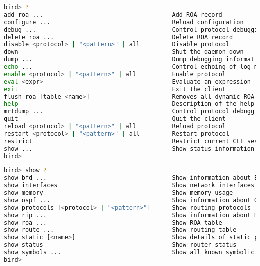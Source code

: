 \begin{lstlisting}[language=bash, caption={Help on Birdc Console mode.}]
bird> ?
add roa ...                                    Add ROA record
configure ...                                  Reload configuration
debug ...                                      Control protocol debugging via BIRD logs
delete roa ...                                 Delete ROA record
disable <protocol> | "<pattern>" | all         Disable protocol
down                                           Shut the daemon down
dump ...                                       Dump debugging information
echo ...                                       Control echoing of log messages
enable <protocol> | "<pattern>" | all          Enable protocol
eval <expr>                                    Evaluate an expression
exit                                           Exit the client
flush roa [table <name>]                       Removes all dynamic ROA records
help                                           Description of the help system
mrtdump ...                                    Control protocol debugging via MRTdump files
quit                                           Quit the client
reload <protocol> | "<pattern>" | all          Reload protocol
restart <protocol> | "<pattern>" | all         Restart protocol
restrict                                       Restrict current CLI session to safe commands
show ...                                       Show status information
bird>
\end{lstlisting}

\begin{lstlisting}[language=bash, caption={Help on \texttt{show} level of Birdc Console mode.}]
bird> show ?
show bfd ...                                   Show information about BFD protocol
show interfaces                                Show network interfaces
show memory                                    Show memory usage
show ospf ...                                  Show information about OSPF protocol
show protocols [<protocol> | "<pattern>"]      Show routing protocols
show rip ...                                   Show information about RIP protocol
show roa ...                                   Show ROA table
show route ...                                 Show routing table
show static [<name>]                           Show details of static protocol
show status                                    Show router status
show symbols ...                               Show all known symbolic names
bird>
\end{lstlisting}